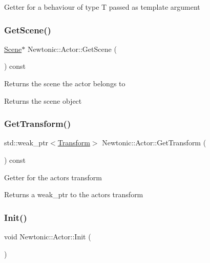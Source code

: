 Getter for a behaviour of type T passed as template argument \mbox{\label{classNewtonic_1_1Actor_ae08f7e9b9197e0aff9f9980535cfb0ee}} 
\subsubsection{\texorpdfstring{GetScene()}{GetScene()}}
{\footnotesize\ttfamily \mbox{\hyperlink{classNewtonic_1_1Scene}{Scene}}$\ast$ Newtonic\+::\+Actor\+::\+Get\+Scene (\begin{DoxyParamCaption}{ }\end{DoxyParamCaption}) const\hspace{0.3cm}{\ttfamily [inline]}}

Returns the scene the actor belongs to \begin{DoxyReturn}{Returns}
the scene object 
\end{DoxyReturn}
\mbox{\label{classNewtonic_1_1Actor_a90648e3cc349aab45bae7ea043a181ec}} 
\subsubsection{\texorpdfstring{GetTransform()}{GetTransform()}}
{\footnotesize\ttfamily std\+::weak\+\_\+ptr$<$\mbox{\hyperlink{classNewtonic_1_1Transform}{Transform}}$>$ Newtonic\+::\+Actor\+::\+Get\+Transform (\begin{DoxyParamCaption}{ }\end{DoxyParamCaption}) const\hspace{0.3cm}{\ttfamily [inline]}}

Getter for the actor\textquotesingle{}s transform \begin{DoxyReturn}{Returns}
a weak\+\_\+ptr to the actor\textquotesingle{}s transform 
\end{DoxyReturn}
\mbox{\label{classNewtonic_1_1Actor_a6e0994c5bf019796f47b5bad78095d57}} 
\subsubsection{\texorpdfstring{Init()}{Init()}}
{\footnotesize\ttfamily void Newtonic\+::\+Actor\+::\+Init (\begin{DoxyParamCaption}{ }\end{DoxyParamCaption})}


